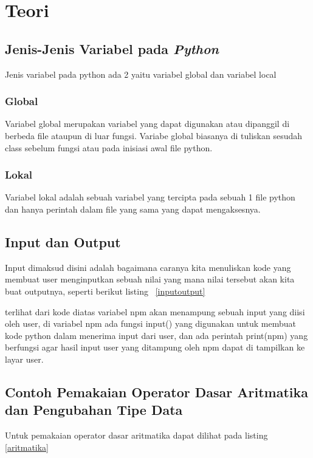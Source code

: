 \chapter{Teori}

\section{Jenis-Jenis Variabel pada \textit{Python}}
Jenis variabel pada python ada 2 yaitu variabel global dan variabel local

\subsection{Global}
Variabel global merupakan variabel yang dapat digunakan atau dipanggil di berbeda file ataupun di luar fungsi. Variabe global biasanya di tuliskan sesudah class sebelum fungsi atau pada inisiasi awal file python.

\subsection{Lokal}
Variabel lokal adalah sebuah variabel yang tercipta pada sebuah 1 file python dan hanya perintah dalam file yang sama yang dapat mengaksesnya.

\section{Input dan Output}
Input dimaksud disini adalah bagaimana caranya kita menuliskan kode yang membuat user menginputkan sebuah nilai yang mana nilai tersebut akan kita buat outputnya, seperti berikut listing ~\ref{inputoutput}



terlihat dari kode diatas variabel npm akan menampung sebuah input yang diisi oleh user, di variabel npm ada fungsi input() yang digunakan untuk membuat kode python dalam menerima input dari user, dan ada perintah print(npm) yang berfungsi agar hasil input user yang ditampung oleh npm dapat di tampilkan ke layar user.

\section{Contoh Pemakaian Operator Dasar Aritmatika dan Pengubahan Tipe Data}
Untuk pemakaian operator dasar aritmatika dapat dilihat pada listing \ref{aritmatika}

